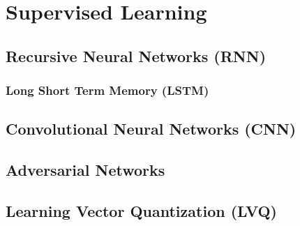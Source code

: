 \section{Supervised Learning}
\label{additional:supervised}

\subsection{Recursive Neural Networks (RNN)}
\label{additional:supervised:RNN}

\subsubsection{Long Short Term Memory (LSTM)}
\label{additional:supervised:RNN:LSTM}

\subsection{Convolutional Neural Networks (CNN)}
\label{additional:supervised:CNN}

\subsection{Adversarial Networks}
\label{additional:supervised:AN}

\subsection{Learning Vector Quantization (LVQ)}
\label{additional:supervised:kNN:LVQ}

